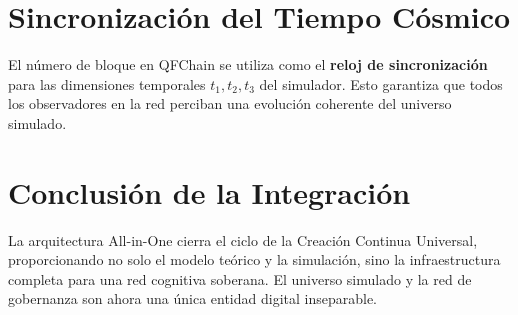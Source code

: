 \section{Sincronización del Tiempo Cósmico}
El número de bloque en QFChain se utiliza como el \textbf{reloj de sincronización} para las dimensiones temporales $t_1, t_2, t_3$ del simulador. Esto garantiza que todos los observadores en la red perciban una evolución coherente del universo simulado.

\section{Conclusión de la Integración}
La arquitectura All-in-One cierra el ciclo de la Creación Continua Universal, proporcionando no solo el modelo teórico y la simulación, sino la infraestructura completa para una red cognitiva soberana. El universo simulado y la red de gobernanza son ahora una única entidad digital inseparable.
